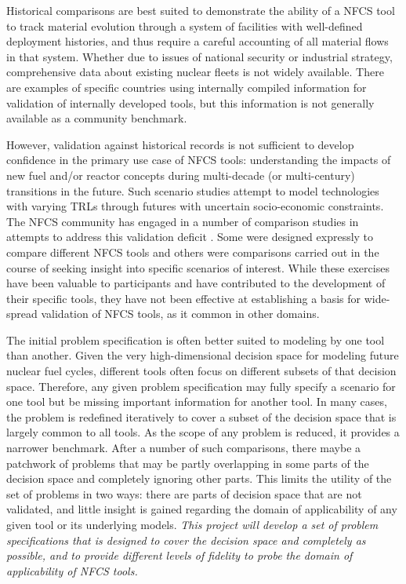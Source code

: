 Historical comparisons are best suited to demonstrate the ability of a
\gls{NFCS} tool to track material evolution through a system of facilities
with well-defined deployment histories, and thus require a careful accounting
of all material flows in that system.  Whether due to issues of national
security or industrial strategy, comprehensive data about existing nuclear
fleets is not widely available.  There are examples of specific countries
using internally compiled information for validation of internally developed
tools\cite{COSI6}, but this information is not generally available
as a community benchmark.

However, validation against historical records is not sufficient to develop
confidence in the primary use case of \gls{NFCS} tools: understanding the
impacts of new fuel and/or reactor concepts during multi-decade (or
multi-century) transitions in the future.  Such scenario studies attempt to
model technologies with varying \glspl{TRL} through futures with uncertain
socio-economic constraints.  The \gls{NFCS} community has engaged in a number of
comparison studies in attempts to address this validation deficit
\cite{NEAbenchmark, MITbenchmark, FENG.ANE.2016}. Some were designed expressly
to compare different \gls{NFCS} tools and others were comparisons carried out in
the course of seeking insight into specific scenarios of interest. While these
exercises have been valuable to participants and have contributed to the
development of their specific tools, they have not been effective at
establishing a basis for wide-spread validation of \gls{NFCS} tools, as it
common in other domains.

The initial problem specification is often better suited to modeling by one
tool than another.  Given the very high-dimensional decision space for
modeling future nuclear fuel cycles, different tools often focus on different
subsets of that decision space.  Therefore, any given problem specification
may fully specify a scenario for one tool but be missing important information
for another tool.  In many cases, the problem is redefined iteratively to
cover a subset of the decision space that is largely common to all tools.  As
the scope of any problem is reduced, it provides a narrower benchmark.  After
a number of such comparisons, there maybe a patchwork of problems that may be
partly overlapping in some parts of the decision space and completely ignoring
other parts.  This limits the utility of the set of problems in two ways:
there are parts of decision space that are not validated, and little insight
is gained regarding the domain of applicability of any given tool or its
underlying models. \emph{This project will develop a set of problem
  specifications that is designed to cover the decision space and completely
  as possible, and to provide different levels of fidelity to probe the domain
  of applicability of \gls{NFCS} tools.}

